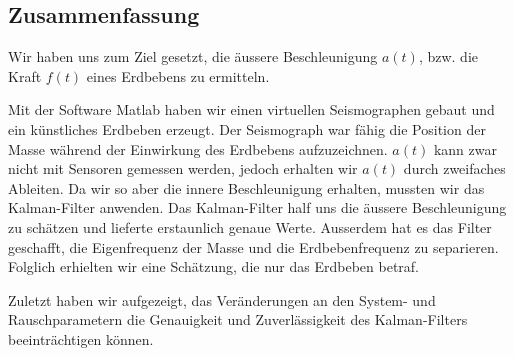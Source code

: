 \subsection{Zusammenfassung}
Wir haben uns zum Ziel gesetzt, die äussere Beschleunigung $a(t)$, bzw. die Kraft $f(t)$ eines Erdbebens zu ermitteln.

Mit der Software Matlab haben wir einen virtuellen Seismographen gebaut und ein künstliches Erdbeben erzeugt.
Der Seismograph war fähig die Position der Masse während der Einwirkung des Erdbebens aufzuzeichnen.
$a(t)$ kann zwar nicht mit Sensoren gemessen werden, jedoch erhalten wir $a(t)$ durch zweifaches Ableiten.
Da wir so aber die innere Beschleunigung erhalten, mussten wir das Kalman-Filter anwenden.
Das Kalman-Filter half uns die äussere Beschleunigung zu schätzen und lieferte erstaunlich genaue Werte.
Ausserdem hat es das Filter geschafft, die Eigenfrequenz der Masse und die Erdbebenfrequenz zu separieren.
Folglich erhielten wir eine Schätzung, die nur das Erdbeben betraf.

Zuletzt haben wir aufgezeigt, das Veränderungen an den System- und Rauschparametern die Genauigkeit und Zuverlässigkeit des Kalman-Filters beeinträchtigen können.

